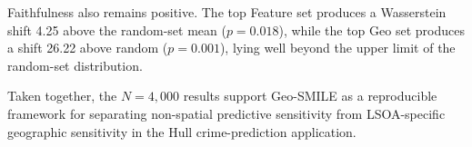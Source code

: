 Faithfulness also remains positive. The top Feature set produces a Wasserstein shift 4.25 above the random-set mean ($p=0.018$), while the top Geo set produces a shift 26.22 above random ($p=0.001$), lying well beyond the upper limit of the random-set distribution.

Taken together, the $N=4{,}000$ results support Geo-SMILE as a reproducible framework for separating non-spatial predictive sensitivity from LSOA-specific geographic sensitivity in the Hull crime-prediction application.

